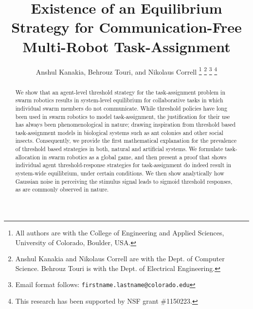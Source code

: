 \documentclass[conference]{ieeeconf}
\begin{document}
\title{Existence of an Equilibrium Strategy for Communication-Free Multi-Robot Task-Assignment}

\author{Anshul Kanakia, Behrouz Touri, and Nikolaus Correll%
\thanks{All authors are with the College of Engineering and Applied Sciences, University of Colorado, Boulder, USA.}%
\thanks{Anshul Kanakia and Nikolaus Correll are with the Dept. of Computer Science. Behrouz Touri is with the Dept. of Electrical Engineering.}%
\thanks{Email format follows: \texttt{firstname.lastname@colorado.edu}}%
\thanks{This research has been supported by NSF grant \#1150223.}%
}

\maketitle

\thispagestyle{empty}
\pagestyle{empty}

\begin{abstract}
We show that an agent-level threshold strategy for the task-assignment problem in swarm robotics results in system-level equilibrium for collaborative tasks in which individual swarm members do not communicate. While threshold policies have long been used in swarm robotics to model task-assignment, the justification for their use has always been phenomenological in nature; drawing inspiration from threshold based task-assignment models in biological systems such as ant colonies and other social insects. Consequently, we provide the first mathematical explanation for the prevalence of threshold based strategies in both, natural and artificial systems. We formulate task-allocation in swarm robotics as a global game, and then present a proof that shows individual agent threshold-response strategies for task-assignment do indeed result in system-wide equilibrium, under certain conditions. We then show analytically how Gaussian noise in perceiving the stimulus signal leads to sigmoid threshold responses, as are commonly observed in nature. 
\end{abstract}
\end{document}

